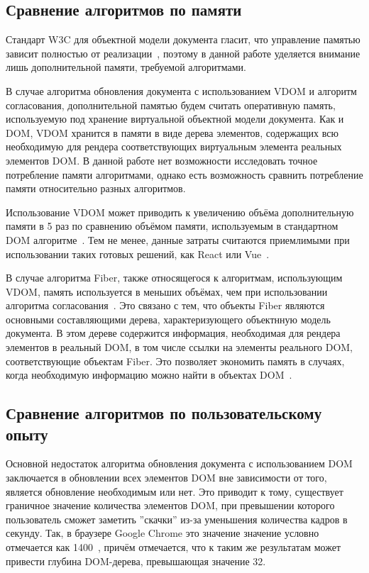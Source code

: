 \subsection{Сравнение алгоритмов по памяти}

Стандарт W3C для объектной модели документа гласит, что управление памятью зависит полностью от реализации~\cite{dom}, поэтому в данной работе уделяется внимание лишь дополнительной памяти, требуемой алгоритмами.

В случае алгоритма обновления документа с использованием VDOM и алгоритм согласования, дополнительной памятью будем считать оперативную память, используемую под хранение виртуальной объектной модели документа. Как и DOM, VDOM хранится в памяти в виде дерева элементов, содержащих всю необходимую для рендера соответствующих виртуальным элемента реальных элементов DOM.  В данной работе нет возможности исследовать точное потребление памяти алгоритмами, однако есть возможность сравнить потребление памяти относительно разных алгоритмов.

Использование VDOM может приводить к увеличению объёма дополнительную памяти в 5 раз по сравнению объёмом памяти, используемым в стандартном DOM алгоритме~\cite{memory-consumption}. Тем не менее, данные затраты считаются приемлимыми при использовании таких готовых решений, как React или Vue~\cite{vdom-overhead}.

В случае алгоритма Fiber, также относящегося к алгоритмам, использующим VDOM, память используется в меньших объёмах, чем при использовании алгоритма согласования~\cite{react-dive}. Это связано с тем, что объекты Fiber являются основными составляющими дерева, характеризующего объектнную модель документа. В этом дереве содержится информация, необходимая для рендера элементов в реальный DOM, в том числе ссылки на элементы реального DOM, соответствующие объектам Fiber. Это позволяет экономить память в случаях, когда необходимую информацию можно найти в объектах DOM~\cite{fiber-saves-memory}.

\subsection{Сравнение алгоритмов по пользовательскому опыту}

Основной недостаток алгоритма обновления документа с использованием DOM заключается в обновлении всех элементов DOM вне зависимости от того, является обновление необходимым или нет. Это приводит к тому, существует граничное значение количества элементов DOM, при превышении которого пользователь сможет заметить ''скачки'' из-за уменьшения количества кадров в секунду. Так, в браузере Google Chrome это значение значение условно отмечается как 1400~\cite{dom-max}, причём отмечается, что к таким же результатам может привести глубина DOM-дерева, превышающая значение 32.

